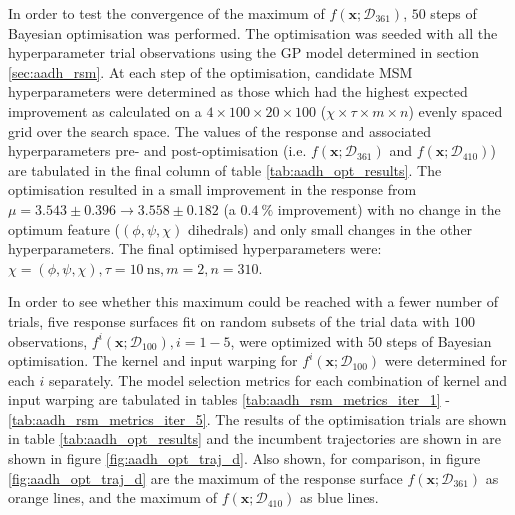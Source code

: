 In order to test the convergence of the maximum of $f(\mathbf{x}; \mathcal{D}_{361})$, $50$ steps of Bayesian optimisation was performed. The optimisation was seeded with all the hyperparameter trial observations using the GP model determined in section \ref{sec:aadh_rsm}. At each step of the optimisation, candidate MSM hyperparameters were determined as those which had the highest expected improvement as calculated on a $4 \times 100 \times 20 \times 100$ ($\chi \times \tau \times m \times n$) evenly spaced grid over the search space. The values of the response and associated hyperparameters pre- and post-optimisation (i.e. $f(\mathbf{x}; \mathcal{D}_{361})$ and $f(\mathbf{x}; \mathcal{D}_{410})$) are tabulated in the final column of table \ref{tab:aadh_opt_results}. The optimisation resulted in a small improvement in the response from $\mu=3.543 \pm 0.396 \rightarrow 3.558 \pm 0.182$ (a $\SI{0.4}{\percent}$ improvement) with no change in the optimum feature ($(\phi, \psi, \chi)$ dihedrals) and only small changes in the other hyperparameters. The final optimised hyperparameters were: $\chi=(\phi, \psi, \chi), \tau=\SI{10}{\nano\second}, m=2, n=310$. 

In order to see whether this maximum could be reached with a fewer number of trials, five response surfaces fit on random subsets of the trial data with $100$ observations, $f^{i}(\mathbf{x};\mathcal{D}_{100}), i = 1 - 5$, were optimized with $50$ steps of Bayesian optimisation. The kernel and input warping for $f^{i}(\mathbf{x};\mathcal{D}_{100})$ were determined for each $i$ separately. The model selection metrics for each combination of kernel and input warping are tabulated in tables \ref{tab:aadh_rsm_metrics_iter_1} - \ref{tab:aadh_rsm_metrics_iter_5}. The results of the optimisation trials are shown in table \ref{tab:aadh_opt_results} and the incumbent trajectories are shown in are shown in figure \ref{fig:aadh_opt_traj_d}. Also shown, for comparison, in figure \ref{fig:aadh_opt_traj_d} are the maximum of the response surface $f(\mathbf{x};\mathcal{D}_{361})$ as orange lines, and the maximum of $f(\mathbf{x};\mathcal{D}_{410})$ as blue lines. 


